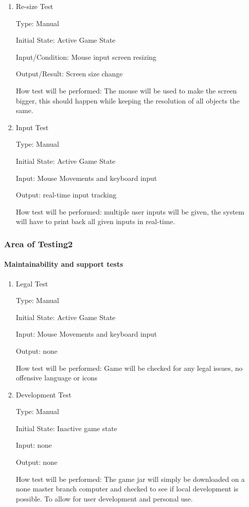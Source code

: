 \documentclass[12pt, titlepage]{article}
\begin{document}
\begin{enumerate}

\item{Re-size Test\\}

Type: Manual
					
Initial State: Active Game State
		
Input/Condition: Mouse input screen resizing
					
Output/Result: Screen size change
					
How test will be performed: The mouse will be used to make the screen bigger, this should happen while keeping the resolution of all objects the same. 
					
\item{Input Test\\}

Type: Manual
					
Initial State: Active Game State
					
Input: Mouse Movements and keyboard input
					
Output: real-time input tracking 
					
How test will be performed: multiple user inputs will be given, the system will have to print back all given inputs in real-time. 

\end{enumerate}

\subsubsection{Area of Testing2}

\paragraph{Maintainability and support tests}

\begin{enumerate}

\item{Legal Test\\}

Type: Manual
					
Initial State: Active Game State
					
Input: Mouse Movements and keyboard input
					
Output: none
					
How test will be performed: Game will be checked for any legal issues, no offensive language or icons 

\item{Development Test\\}

Type: Manual
					
Initial State: Inactive game state
					
Input: none
					
Output: none
					
How test will be performed: The game jar will simply be downloaded on a none master branch computer and checked to see if local development is possible. To allow for user development and personal use. 


\end{enumerate}
\end{document}
